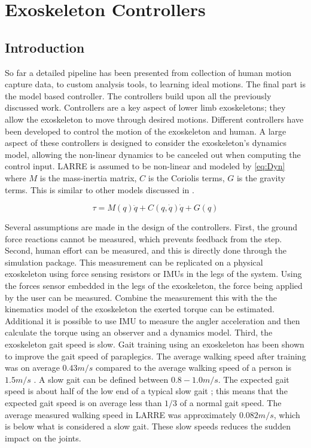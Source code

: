 \chapter{Exoskeleton Controllers}
\label{chap:controllers}
\section{Introduction}
So far a detailed pipeline has been presented from collection of human motion capture data, to custom analysis tools, to learning ideal motions. The final part is the model based controller. The controllers build upon all the previously discussed work.  
Controllers are a key aspect of lower limb exoskeletons; they allow the exoskeleton to move through desired motions. Different controllers have been developed to control the motion of the exoskeleton and human. A large aspect of these controllers is designed to consider the exoskeleton's dynamics model, allowing the non-linear dynamics to be canceled out when computing the control input. LARRE is assumed to be non-linear and modeled by \autoref{eq:Dyn} where $M$ is the mass-inertia matrix, $C$ is the Coriolis terms, $G$ is the gravity terms. This is similar to other models discussed in \cite{huo2016active} \cite{vantilt2019model}.

\begin{equation}
    \tau = M(q) \ddot{q} + C(q, \dot{q}) \dot{q} + G(q)
    \label{eq:Dyn}
\end{equation}


Several assumptions are made in the design of the controllers. First, the ground force reactions cannot be measured, which prevents feedback from the step. Second, human effort can be measured, and this is directly done through the simulation package. This measurement can be replicated on a physical exoskeleton using force sensing resistors or IMUs in the legs of the system. Using the forces sensor embedded in the legs of the exoskeleton, the force being applied by the user can be measured. Combine the measurement this with the the kinematics model of the exoskeleton the exerted torque can be estimated. Additional it is possible to use IMU to measure the angler acceleration and then calculate the torque using an observer and a dynamics model. Third, the exoskeleton gait speed is slow. Gait training using an exoskeleton has been shown to improve the gait speed of paraplegics. The average walking speed after training was on average $0.43m/s$ \cite{khan2019retraining} compared to the average walking speed of a person is $1.5m/s$ \cite{fitzpatrick2006another}. A slow gait can be defined between $0.8-1.0m/s$. The expected gait speed is about half of the low end of a typical slow gait \cite{walsh2007quasi}; this means that the expected gait speed is on average less than $1/3$ of a normal gait speed. The average measured walking speed in LARRE was approximately $0.082m/s$, which is below what is considered a slow gait. These slow speeds reduces the sudden impact on the joints. 

